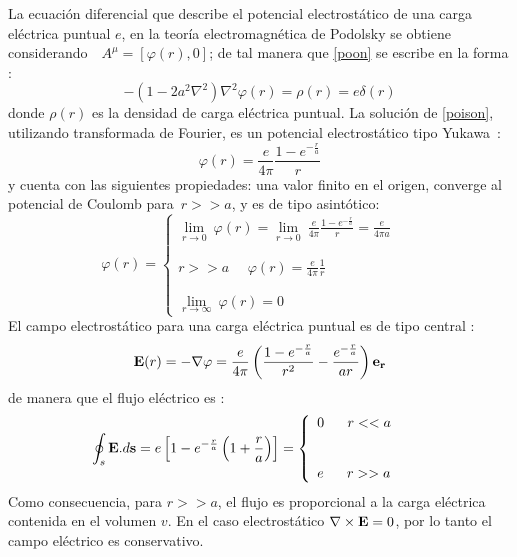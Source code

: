 \documentclass[a4paper,12pt]{article}
\begin{document}
La ecuación diferencial que describe el potencial electrostático de una \mbox{carga} eléctrica puntual $e$, en la teoría electromagnética de Podolsky se obtiene \mbox{considerando  \mbox{ $A^\mu=[\varphi(r),0]$};} de tal manera que \eqref{poon} se escribe en la forma \cite{podolfuerza, gaualor}:
\begin{equation}
-(1-2a^2\nabla^2)\nabla^2 \varphi(r)=\rho(r)=  e\delta(r)
\label{poison}
\end{equation}
donde $\rho(r)$ es la densidad de carga eléctrica puntual. La solución de \eqref{poison}, utilizando transformada de Fourier, es un potencial electrostático tipo \mbox{Yukawa \cite{podolfuerza,gaualor,yukawa}}:
\begin{equation}
\varphi(r)=\frac{e}{4\pi}\frac{1-e^{-\frac{r}{a}}}{r}
\label{yukawa} 
\end{equation}
y cuenta con las siguientes propiedades: una valor finito en el origen, converge al potencial de Coulomb \mbox{para $r>>a$}, y es de tipo asintótico:  
\begin{equation}
\varphi(r)=\left\{ \begin{array}{lcl}
\lim\limits_{r\rightarrow 0}\ \varphi(r)=\lim\limits_{r\rightarrow 0}\ \frac{e}{4\pi}\frac{1-e^{-\frac{r}{a}}}{r}=\frac{e}{4\pi a} & \\
&
&
\\


\\
r>>a\ \ \ \  \ \  \varphi(r)=\frac{e}{4\pi}\frac{1}{r} 
& \\
&
&
\\


\\ \lim\limits_{r\rightarrow \infty}\ \varphi(r)=0

\end{array}
\right.
\label{proyu}
\end{equation}
El campo electrostático para una carga eléctrica puntual es de tipo central \cite{podolfuerza}:
\begin{equation}
{\bf E}(r)=-\nabla\varphi=\frac{e}{4\pi}\left(\frac{1-e^{-\frac{r}{a}}}{r^2}-\frac{e^{-\frac{r}{a}}}{ar} \right){\bf e_r} 
\label{celepo}
\end{equation}
de manera que el flujo eléctrico es \cite{podolfuerza}:
\begin{equation}
\oint_s {\bf E}.d{\bf s}=e\left[1-e^{-\frac{r}{a}}\left(1+\frac{r}{a}\right) \right]=\left\{ \begin{array}{lcl}
0\ \ \ \ \ r<<a \\
&
&
\\


\\
e\ \ \  \ \  r>>a

\end{array}
\right.
\label{flujo}
\end{equation}
Como consecuencia, para $r>>a$, el flujo es proporcional a la carga eléctrica contenida en el volumen $v$. En el caso electrostático \mbox{$\nabla \times {\bf E}=0$,} por lo tanto el campo eléctrico es \mbox{conservativo.}
\end{document}
